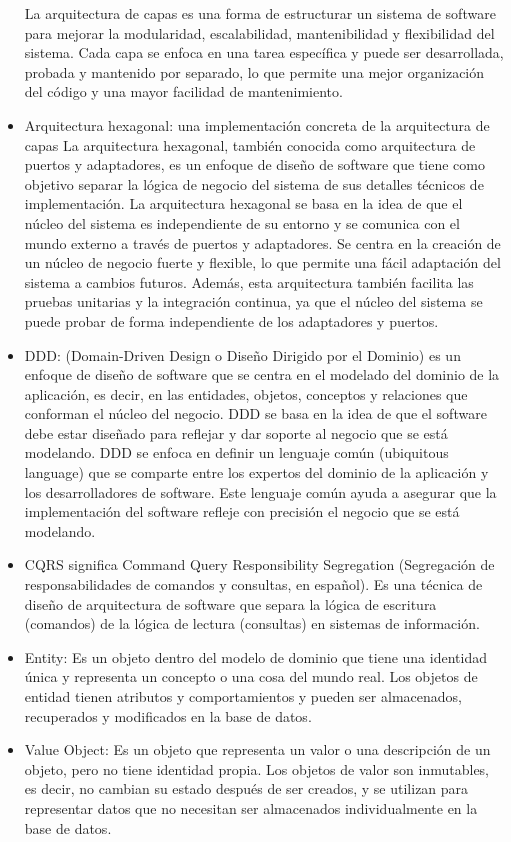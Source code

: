 \begin{itemize}
	La arquitectura de capas es una forma de estructurar un sistema de software para mejorar la modularidad, escalabilidad, mantenibilidad y flexibilidad del sistema. Cada capa se enfoca en una tarea específica y puede ser desarrollada, probada y mantenido por separado, lo que permite una mejor organización del código y una mayor facilidad de mantenimiento.
	\item Arquitectura hexagonal: una implementación concreta de la arquitectura de capas La arquitectura hexagonal, también conocida como arquitectura de puertos y adaptadores, es un enfoque de diseño de software que tiene como objetivo separar la lógica de negocio del sistema de sus detalles técnicos de implementación. La arquitectura hexagonal se basa en la idea de que el núcleo del sistema es independiente de su entorno y se comunica con el mundo externo a través de puertos y adaptadores. Se centra en la creación de un núcleo de negocio fuerte y flexible, lo que permite una fácil adaptación del sistema a cambios futuros. Además, esta arquitectura también facilita las pruebas unitarias y la integración continua, ya que el núcleo del sistema se puede probar de forma independiente de los adaptadores y puertos.
	\item DDD: (Domain-Driven Design o Diseño Dirigido por el Dominio) es un enfoque de diseño de software que se centra en el modelado del dominio de la aplicación, es decir, en las entidades, objetos, conceptos y relaciones que conforman el núcleo del negocio. DDD se basa en la idea de que el software debe estar diseñado para reflejar y dar soporte al negocio que se está modelando.
	DDD se enfoca en definir un lenguaje común (ubiquitous language) que se comparte entre los expertos del dominio de la aplicación y los desarrolladores de software. Este lenguaje común ayuda a asegurar que la implementación del software refleje con precisión el negocio que se está modelando.
	\item CQRS significa Command Query Responsibility Segregation (Segregación de responsabilidades de comandos y consultas, en español). Es una técnica de diseño de arquitectura de software que separa la lógica de escritura (comandos) de la lógica de lectura (consultas) en sistemas de información.
	\item Entity: Es un objeto dentro del modelo de dominio que tiene una identidad única y representa un concepto o una cosa del mundo real. Los objetos de entidad tienen atributos y comportamientos y pueden ser almacenados, recuperados y modificados en la base de datos.
	\item Value Object: Es un objeto que representa un valor o una descripción de un objeto, pero no tiene identidad propia. Los objetos de valor son inmutables, es decir, no cambian su estado después de ser creados, y se utilizan para representar datos que no necesitan ser almacenados individualmente en la base de datos.

\end{itemize}
